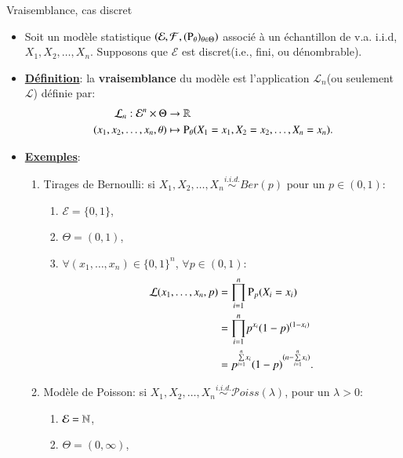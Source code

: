 \begin{frame}[allowframebreaks]{Vraisemblance, cas discret}
    \begin{itemize}
        \item Soit un modèle statistique $\left(\mathcal{E}, \mathcal{F}, (\operatorname{P}_\theta)_{\theta\in\Theta}\right)$ 
        associé à un échantillon de v.a. i.i.d,  $X_1, X_2, \ldots, X_n$.  
        Supposons que $\mathcal{E}$ est discret(i.e., fini, ou dénombrable).
        \item \textbf{\underline{Définition}}: la \textbf{vraisemblance} du modèle 
        est l'application $\mathcal{L}_n$(ou seulement $\mathcal{L}$) définie par: 
        \begin{align*}
            \mathcal{L}_n : \mathcal{E}^n\times\Theta &\rightarrow \mathbb{R}\\
            (x_1, x_2, \ldots, x_n, \theta) &\mapsto \operatorname{P}_\theta(X_1=x_1, X_2 =x_2, \ldots, X_n = x_n).
        \end{align*}
        \framebreak
        \item \textbf{\underline{Exemples}}:
        \begin{enumerate}
            \item Tirages de Bernoulli: si $X_1, X_2, \ldots, X_n \overset{i.i.d.}{\sim}Ber(p)$ pour un
             $p\in(0, 1)$:
             \begin{enumerate}[-]
                 \item $\mathcal{E}= \{0, 1\}$,
                 \item $\Theta = (0, 1)$,
                 \item $\forall(x_1, \ldots, x_n)\in \{0, 1\}^n$, $\forall p\in(0,1)$: \begin{align*}
                     \mathcal{L}(x_1, \ldots, x_n, p) &= \underset{i=1}{\overset{n}{\prod}} \operatorname{P}_p(X_i=x_i)\\
                     &=\underset{i=1}{\overset{n}{\prod}} p^{x_i}(1-p)^{(1-x_i)}\\
                     &= p^{\underset{i=1}{\overset{n}{\sum}} x_i}(1-p)^{(n-\underset{i=1}{\overset{n}{\sum}} x_i)}.
                 \end{align*}
             \end{enumerate}
             \framebreak
             \item Modèle de Poisson: si $X_1, X_2, \ldots, X_n \overset{i.i.d.}{\sim}\mathcal{P}oiss(\lambda)$,
             pour un $\lambda > 0$: 
             \begin{enumerate}[-]
                 \item $\mathcal{E}= \mathbb{N}$,
                 \item $\Theta = (0, \infty)$,

\end{enumerate}
\end{enumerate}
\end{itemize}
\end{frame}
